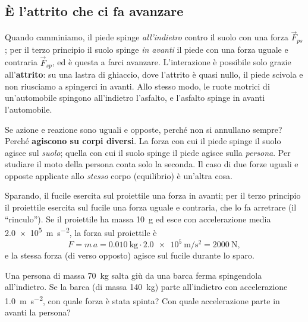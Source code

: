 \subsection{È l'attrito che ci fa avanzare}
Quando camminiamo, il piede spinge \emph{all'indietro} contro il suolo con una forza $\vec F_{ps}$; per il terzo principio il suolo spinge \emph{in avanti} il piede con una forza uguale e contraria $\vec F_{sp}$, ed è questa a farci avanzare. L'interazione è possibile solo grazie all'\textbf{attrito}: su una lastra di ghiaccio, dove l'attrito è quasi nullo, il piede scivola e non riusciamo a spingerci in avanti. Allo stesso modo, le ruote motrici di un'automobile spingono all'indietro l'asfalto, e l'asfalto spinge in avanti l'automobile.

\begin{remark}
Se azione e reazione sono uguali e opposte, perché non si annullano sempre? Perché \textbf{agiscono su corpi diversi}. La forza con cui il piede spinge il suolo agisce sul \emph{suolo}; quella con cui il suolo spinge il piede agisce sulla \emph{persona}. Per studiare il moto della persona conta solo la seconda. Il caso di due forze uguali e opposte applicate allo \emph{stesso} corpo (equilibrio) è un'altra cosa.
\end{remark}

\begin{testexample}
Sparando, il fucile esercita sul proiettile una forza in avanti; per il terzo principio il proiettile esercita sul fucile una forza uguale e contraria, che lo fa arretrare (il ``rinculo''). Se il proiettile ha massa \SI{10}{\gram} ed esce con accelerazione media \SI{2,0e5}{\metre\per\second\squared}, la forza sul proiettile è
\[ F = m\,a = \SI{0,010}{\kilo\gram} \cdot \SI{2,0e5}{\metre\per\second\squared} = \SI{2000}{\newton}, \]
e la stessa forza (di verso opposto) agisce sul fucile durante lo sparo.
\end{testexample}

\begin{esercizio}
Una persona di massa \SI{70}{\kilo\gram} salta giù da una barca ferma spingendola all'indietro. Se la barca (di massa \SI{140}{\kilo\gram}) parte all'indietro con accelerazione \SI{1,0}{\metre\per\second\squared}, con quale forza è stata spinta? Con quale accelerazione parte in avanti la persona?\\
\end{esercizio}

